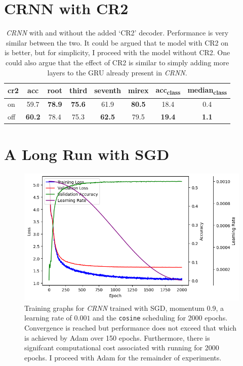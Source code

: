 \section{CRNN with CR2}\label{app:crnn_with_cr2}

\begin{table}[H]
    \centering
    \begin{tabular}{lccccccc}
        \toprule
        cr2 & acc & root & third & seventh & mirex & acc\textsubscript{class} & median\textsubscript{class} \\  
        \midrule
        on & 59.7 & \textbf{78.9} & \textbf{75.6} & 61.9 & \textbf{80.5} & 18.4 & 0.4 \\
        off & \textbf{60.2} & 78.4 & 75.3 & \textbf{62.5} & 79.5 & \textbf{19.4} & \textbf{1.1} \\
        \bottomrule
    \end{tabular}
    \caption{\emph{CRNN} with and without the added `CR2' decoder. Performance is very similar between the two. It could be argued that te model with CR2 on is better, but for simplicity, I proceed with the model without CR2. One could also argue that the effect of CR2 is similar to simply adding more layers to the GRU already present in \emph{CRNN}.}
\end{table}

\section{A Long Run with SGD}\label{app:long_sgd}
\begin{figure}[H]
    \centering
    \includegraphics[width=1.0\textwidth]{figures/long_sgd_training_plot.png}
    \caption{Training graphs for \emph{CRNN} trained with SGD, momentum 0.9, a learning rate of $0.001$ and the \texttt{cosine} scheduling for 2000 epochs. Convergence is reached but performance does not exceed that which is achieved by Adam over 150 epochs. Furthermore, there is signifcant computational cost associated with running for 2000 epochs. I proceed with Adam for the remainder of experiments. }\label{fig:long_sgd}
\end{figure}



